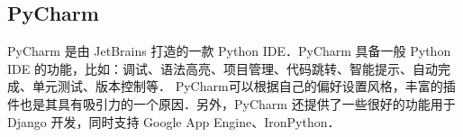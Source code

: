 
\begin{issues}
\issueDraft
\issueTODO
\end{issues}

\subsection{PyCharm}
  PyCharm 是由 JetBrains 打造的一款 Python IDE．PyCharm 具备一般 Python IDE 的功能，比如：调试、语法高亮、项目管理、代码跳转、智能提示、自动完成、单元测试、版本控制等． PyCharm可以根据自己的偏好设置风格，丰富的插件也是其具有吸引力的一个原因．另外，PyCharm 还提供了一些很好的功能用于 Django 开发，同时支持 Google App Engine、IronPython．
